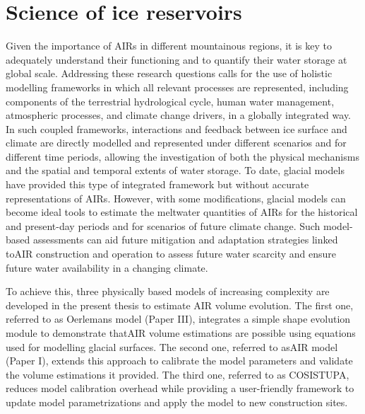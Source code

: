 \chapter{Science of ice reservoirs}
\label{chap:science}


Given the importance of \ac{AIRs} in different mountainous regions, it is key to adequately understand their
functioning and to quantify their water storage at global scale. Addressing these research questions
calls for the use of holistic modelling frameworks in which all relevant processes are represented, including
components of the terrestrial hydrological cycle, human water management, atmospheric processes, and climate
change drivers, in a globally integrated way. In such coupled frameworks, interactions and feedback between
ice surface and climate are directly modelled and represented under different scenarios and for different time
periods, allowing the investigation of both the physical mechanisms and the spatial and temporal extents of water
storage. To date, glacial models have provided this type of integrated framework but without accurate
representations of \ac{AIRs}. However, with some modifications, glacial models can become ideal tools to estimate the
meltwater quantities of \ac{AIRs} for the historical and present-day periods and for scenarios of future
climate change. Such model-based assessments can aid future mitigation and adaptation strategies linked to\ac{AIR}
construction and operation to assess future water scarcity and ensure future water availability in a changing
climate.

To achieve this, three physically based models of increasing complexity are developed in the present thesis to estimate
AIR volume evolution. The first one, referred to as Oerlemans model (Paper III), integrates a simple shape
evolution module to demonstrate that\ac{AIR} volume estimations are possible using equations used for modelling
glacial surfaces. The second one, referred to as\ac{AIR} model (Paper I), extends this approach to calibrate the
model parameters and validate the volume estimations it provided. The third one, referred to as COSISTUPA,
reduces model calibration overhead while providing a user-friendly framework to update model parametrizations
and apply the model to new construction sites. 

